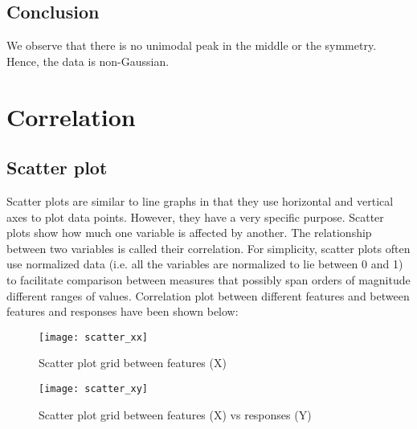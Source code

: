 \subsection{Conclusion}
We observe that there is no unimodal peak in the middle or the symmetry. Hence, the data is non-Gaussian.

\section{Correlation}
  \subsection{Scatter plot}
    Scatter plots are similar to line graphs in that they use horizontal and vertical axes to plot data points. However, they have a very specific purpose. Scatter plots show how much one variable is affected by another. The relationship between two variables is called their correlation. For simplicity, scatter plots often use normalized data (i.e. all the variables are normalized to lie between 0 and 1) to facilitate comparison between measures that possibly span orders of magnitude different ranges of values.
Correlation plot between different features and between features and responses have been shown below:    
    \begin{figure}
      \centering
      \texttt{[image: scatter\_xx]}
      \caption{Scatter plot grid between features (X)}
      \label{fig:scatter_xx}
    \end{figure}
    \begin{figure}
      \centering
      \texttt{[image: scatter\_xy]}
      \caption{Scatter plot grid between features (X) vs responses (Y)}
      \label{fig:scatter_xy}
    \end{figure}
